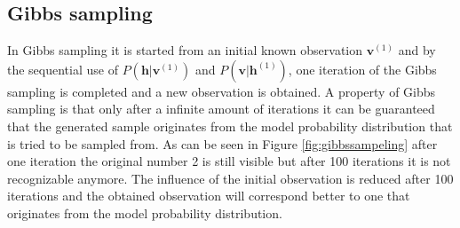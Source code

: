 \documentclass[a4paper,10pt]{article}
\begin{document}
\subsection{Gibbs sampling}
In Gibbs sampling it is started from an initial known observation $ \bm{v}^{(1)} $ and by the sequential use of $ P(\bm{h}|\bm{v}^{(1)}) $ and $ P(\bm{v}|\bm{h}^{(1)}) $, one iteration of the Gibbs sampling is completed and a new observation is obtained. A property of Gibbs sampling is that only after a infinite amount of iterations it can be guaranteed that the generated sample originates from the model probability distribution that is tried to be sampled from. As can be seen in Figure \ref{fig:gibbssampeling} after one iteration the original number 2 is still visible but after 100 iterations it is not recognizable anymore. The influence of the initial observation is reduced after 100 iterations and the obtained observation will correspond better to one that  originates from the model probability distribution. 
\end{document}
